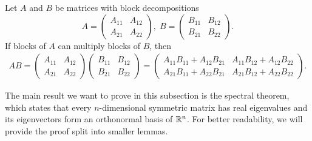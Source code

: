 \begin{property}
    Let $A$ and $B$ be matrices with block decompositions 
    $$A=\left(
      \begin{array}{c|c}
        A_{11} & A_{12} \\ \hline
        A_{21} & A_{22}
      \end{array}
    \right),\; B=\left(
      \begin{array}{c|c}
        B_{11} & B_{12} \\ \hline
        B_{21} & B_{22}
      \end{array}
    \right).
    $$ 
    If blocks of $A$ can multiply blocks of $B$, then
    \begin{align*}
    AB = 
    \left(
    \begin{array}{c|c}
    A_{11} & A_{12} \\ \hline
    A_{21} & A_{22}
    \end{array}
    \right)
    \left(
    \begin{array}{c|c}
    B_{11} & B_{12} \\ \hline
    B_{21} & B_{22}
    \end{array}
    \right)
    =
    \left(
    \begin{array}{c|c}
    A_{11}B_{11} + A_{12}B_{21} & A_{11}B_{12} + A_{12}B_{22} \\ \hline
    A_{21}B_{11} + A_{22}B_{21} & A_{21}B_{12} + A_{22}B_{22}
    \end{array}
    \right).
    \end{align*}
\end{property}

The main result we want to prove in this subsection is the spectral theorem, which states that every $n$-dimensional symmetric matrix has real eigenvalues and its eigenvectors form an orthonormal basis of $\mathbb{R}^n$. For better readability, we will provide the proof split into smaller lemmas.


